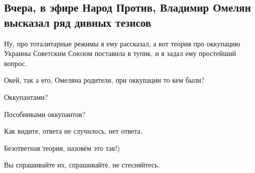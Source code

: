  
 
 
 
 
\subsection{Вчера, в эфире Народ Против, Владимир Омелян высказал ряд дивных тезисов}

Ну, про тоталитарные режимы я ему рассказал, а вот теория про оккупацию Украины
Советским Союзом поставила в тупик, и я задал ему простейший вопрос.

Окей, так а его, Омеляна родители, при оккупации то кем были?

Оккупантами?

Пособниками оккупантов?

Как видите, ответа не случилось, нет ответа.

Безответная теория, назовём это так!)

Вы спрашивайте их, спрашивайте, не стесняйтесь.
